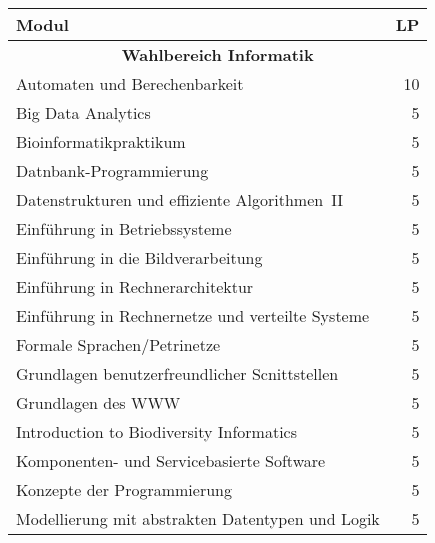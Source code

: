 \begin{table}[!th]
	\begin{small}
		\begin{tabularx}{\textwidth}{|X||r|}
			\hline
			\textbf{Modul}                                                      & \textbf{LP} \\ \hline\hline
			\multicolumn{2}{|c|}{\textbf{Wahlbereich Informatik}}                \\ \hline
			Automaten und Berechenbarkeit                                       &          10 \\ \hline
			Big Data Analytics                                                  &           5 \\ \hline
			Bioinformatikpraktikum                                              &           5 \\ \hline
			Datnbank-Programmierung                                             &           5 \\ \hline
			Datenstrukturen und effiziente Algorithmen~II                       &           5 \\ \hline
			Einführung in Betriebssysteme                                       &           5 \\ \hline
			Einführung in die Bildverarbeitung                                  &           5 \\ \hline
			Einführung in Rechnerarchitektur                                    &           5 \\ \hline
			Einführung in Rechnernetze und verteilte Systeme                    &           5 \\ \hline
			Formale Sprachen/Petrinetze                                         &           5 \\ \hline
			Grundlagen benutzerfreundlicher Scnittstellen                       &           5 \\ \hline
			Grundlagen des WWW                                                  &           5 \\ \hline
			Introduction to Biodiversity Informatics                            &           5 \\ \hline
			Komponenten- und Servicebasierte Software                           &           5 \\ \hline
			Konzepte der Programmierung                                         &           5 \\ \hline
			Modellierung mit abstrakten Datentypen und Logik                    &           5 \\ \hline

\end{tabularx}
\end{small}
\end{table}
